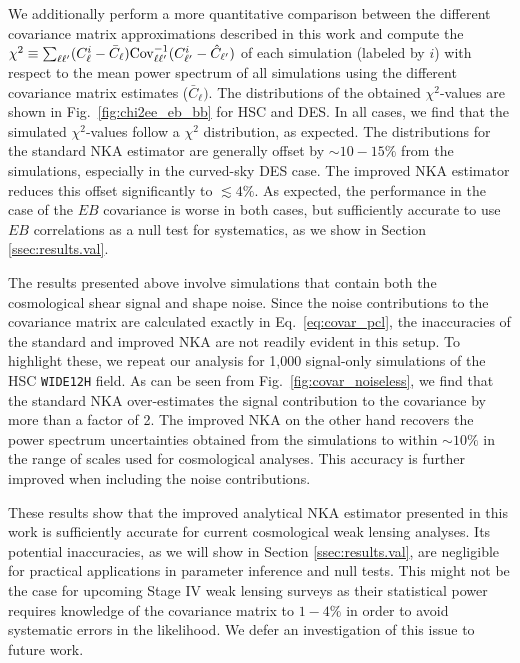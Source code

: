 \documentclass[a4paper,11pt]{article}
\begin{document}
        We additionally perform a more quantitative comparison between the different covariance matrix approximations described in this work and compute the $\chi^2 \equiv \sum_{\ell\ell'}(C_\ell^{i} - \bar{C}_\ell) {\rm Cov}^{-1}_{\ell\ell'} (C_{\ell'}^{i} - \hat{C}_{\ell'})$ of each simulation (labeled by $i$) with respect to the mean power spectrum of all simulations using the different covariance matrix estimates ($\bar{C}_\ell)$. The distributions of the obtained $\chi^2$-values are shown in Fig.~\ref{fig:chi2ee_eb_bb} for HSC and DES. In all cases, we find that the simulated $\chi^2$-values follow a $\chi^2$ distribution,  as expected. The distributions for the standard NKA estimator are generally offset by $\sim10-15\%$ from the simulations, especially in the curved-sky DES case. The improved NKA estimator reduces this offset significantly to $\lesssim4\%$. As expected, the performance in the case of the $EB$ covariance is worse in both cases, but sufficiently accurate to use $EB$ correlations as a null test for systematics, as we show in Section \ref{ssec:results.val}.
        
        The results presented above involve simulations that contain both the cosmological shear signal and shape noise. Since the noise contributions to the covariance matrix are calculated exactly in Eq.~\ref{eq:covar_pcl}, the inaccuracies of the standard and improved NKA are not readily evident in this setup. To highlight these, we repeat our analysis for 1{,}000 signal-only simulations of the HSC \texttt{WIDE12H} field. As can be seen from Fig.~\ref{fig:covar_noiseless}, we find that the standard NKA over-estimates the signal contribution to the covariance by more than a factor of 2. The improved NKA on the other hand recovers the power spectrum uncertainties obtained from the simulations to within $\sim10\%$ in the range of scales used for cosmological analyses. This accuracy is further improved when including the noise contributions.

        These results show that the improved analytical NKA estimator presented in this work is sufficiently accurate for current cosmological weak lensing analyses. Its potential inaccuracies, as we will show in Section \ref{ssec:results.val}, are negligible for practical applications in parameter inference and null tests. This might not be the case for upcoming Stage IV weak lensing surveys as their statistical power requires knowledge of the covariance matrix to $1-4 \%$ in order to avoid systematic errors in the likelihood. We defer an investigation of this issue to future work.
\end{document}
